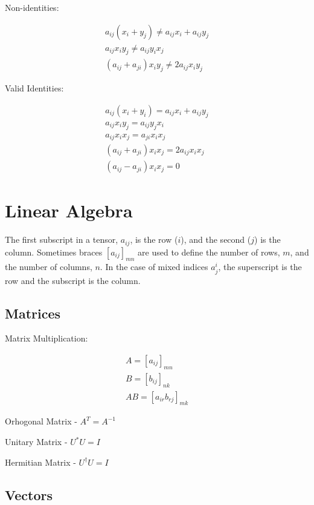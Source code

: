 \documentclass{article}
\begin{document}
\noindent
Non-identities:

\begin{align*}
a_{ij}(x_i + y_j) \neq a_{ij} x_i + a_{ij} y_j\\
a_{ij} x_i y_j \neq a_{ij} y_i x_j\\
(a_{ij} + a_{ji}) x_i y_j \neq 2 a_{ij} x_i y_j
\end{align*}

\noindent
Valid Identities:

\begin{align}
a_{ij}(x_i + y_i) = a_{ij} x_i + a_{ij} y_j\\
a_{ij} x_i y_j = a_{ij} y_j x_i\\
a_{ij} x_i x_j = a_{ji} x_i x_j\\
( a_{ij} + a_{ji} ) x_i x_j = 2 a_{ij} x_i x_j\\
( a_{ij} - a_{ji} ) x_i x_j = 0
\end{align}

%
%
\newpage
\section{Linear Algebra}

\noindent
The first subscript in a tensor, $a_{ij}$, is the row ($i$), and the second ($j$) is the column.  Sometimes braces $[a_{ij}]_{mn}$ are used to define the number of rows, $m$, and the number of columns, $n$.  In the case of mixed indices $a^i_j$, the superscript is the row and the subscript is the column.

\subsection{Matrices}

\noindent
Matrix Multiplication:

\begin{align*}
	A = [ a_{ij} ]_{mn}\\
	B = [ b_{ij} ]_{nk}\\
	AB = [ a_{ir} b_{rj} ]_{mk}
\end{align*}

\noindent
Orhogonal Matrix - $A^T = A^{-1}$

\noindent
Unitary Matrix - $U^* U = I$

\noindent
Hermitian Matrix - $U^\dag U = I$

\subsection{Vectors}
\end{document}
